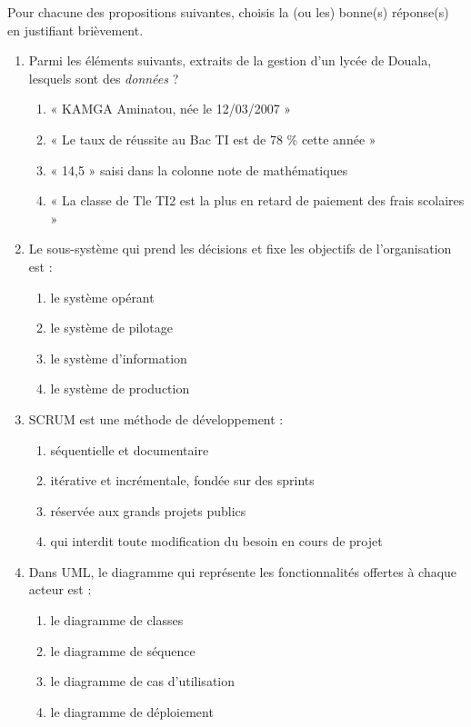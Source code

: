 \documentclass[11pt]{article}
\begin{document}
\begin{exercice}
Pour chacune des propositions suivantes, choisis la (ou les) bonne(s) réponse(s) en justifiant brièvement.
\begin{enumerate}
    \item Parmi les éléments suivants, extraits de la gestion d'un lycée de Douala, lesquels sont des \emph{données} ?
    \begin{enumerate}
        \item « KAMGA Aminatou, née le 12/03/2007 »
        \item « Le taux de réussite au Bac TI est de 78 \% cette année »
        \item « 14,5 » saisi dans la colonne note de mathématiques
        \item « La classe de Tle TI2 est la plus en retard de paiement des frais scolaires »
    \end{enumerate}
    \item Le sous-système qui prend les décisions et fixe les objectifs de l'organisation est :
    \begin{enumerate}
        \item le système opérant
        \item le système de pilotage
        \item le système d'information
        \item le système de production
    \end{enumerate}
    \item SCRUM est une méthode de développement :
    \begin{enumerate}
        \item séquentielle et documentaire
        \item itérative et incrémentale, fondée sur des sprints
        \item réservée aux grands projets publics
        \item qui interdit toute modification du besoin en cours de projet
    \end{enumerate}
    \item Dans UML, le diagramme qui représente les fonctionnalités offertes à chaque acteur est :
    \begin{enumerate}
        \item le diagramme de classes
        \item le diagramme de séquence
        \item le diagramme de cas d'utilisation
        \item le diagramme de déploiement
    \end{enumerate}
\end{enumerate}
\end{exercice}
\end{document}

